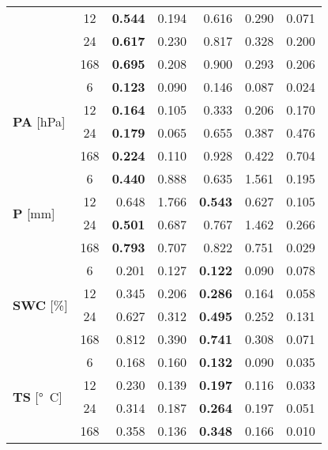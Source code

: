 \begin{table}
\begin{tabular}{p{2.1cm}c|rr|rr|r}
 & 12 & \bfseries 0.544 & 0.194 & 0.616 & 0.290 & 0.071 \\
 & 24 & \bfseries 0.617 & 0.230 & 0.817 & 0.328 & 0.200 \\
 & 168 & \bfseries 0.695 & 0.208 & 0.900 & 0.293 & 0.206 \\
\cline{1-7}
\multirow[c]{4}{*}{\parbox{2.1cm}{\textbf{PA} [\si{hPa}]}} & 6 & \bfseries 0.123 & 0.090 & 0.146 & 0.087 & 0.024 \\
 & 12 & \bfseries 0.164 & 0.105 & 0.333 & 0.206 & 0.170 \\
 & 24 & \bfseries 0.179 & 0.065 & 0.655 & 0.387 & 0.476 \\
 & 168 & \bfseries 0.224 & 0.110 & 0.928 & 0.422 & 0.704 \\
\cline{1-7}
\multirow[c]{4}{*}{\parbox{2.1cm}{\textbf{P} [\si{mm}]}} & 6 & \bfseries 0.440 & 0.888 & 0.635 & 1.561 & 0.195 \\
 & 12 & 0.648 & 1.766 & \bfseries 0.543 & 0.627 & 0.105 \\
 & 24 & \bfseries 0.501 & 0.687 & 0.767 & 1.462 & 0.266 \\
 & 168 & \bfseries 0.793 & 0.707 & 0.822 & 0.751 & 0.029 \\
\cline{1-7}
\multirow[c]{4}{*}{\parbox{2.1cm}{\textbf{SWC} [\si{\%}]}} & 6 & 0.201 & 0.127 & \bfseries 0.122 & 0.090 & 0.078 \\
 & 12 & 0.345 & 0.206 & \bfseries 0.286 & 0.164 & 0.058 \\
 & 24 & 0.627 & 0.312 & \bfseries 0.495 & 0.252 & 0.131 \\
 & 168 & 0.812 & 0.390 & \bfseries 0.741 & 0.308 & 0.071 \\
\cline{1-7}
\multirow[c]{4}{*}{\parbox{2.1cm}{\textbf{TS} [\si{°C}]}} & 6 & 0.168 & 0.160 & \bfseries 0.132 & 0.090 & 0.035 \\
 & 12 & 0.230 & 0.139 & \bfseries 0.197 & 0.116 & 0.033 \\
 & 24 & 0.314 & 0.187 & \bfseries 0.264 & 0.197 & 0.051 \\
 & 168 & 0.358 & 0.136 & \bfseries 0.348 & 0.166 & 0.010 \\
\cline{1-7}
\bottomrule
\end{tabular}
\end{table}
